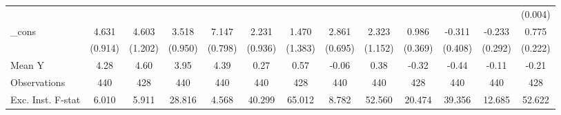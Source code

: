 {\begin{tabular}{l*{12}{c}}
            &                     &                     &                     &                     &                     &                     &                     &                     &                     &                     &                     &     (0.004)         \\
\addlinespace
\_cons      &       4.631\sym{***}&       4.603\sym{***}&       3.518\sym{***}&       7.147\sym{***}&       2.231\sym{**} &       1.470         &       2.861\sym{***}&       2.323\sym{*}  &       0.986\sym{**} &      -0.311         &      -0.233         &       0.775\sym{***}\\
            &     (0.914)         &     (1.202)         &     (0.950)         &     (0.798)         &     (0.936)         &     (1.383)         &     (0.695)         &     (1.152)         &     (0.369)         &     (0.408)         &     (0.292)         &     (0.222)         \\
\midrule
Mean Y      &        4.28         &        4.60         &        3.95         &        4.39         &        0.27         &        0.57         &       -0.06         &        0.38         &       -0.32         &       -0.44         &       -0.11         &       -0.21         \\
Observations&         440         &         428         &         440         &         440         &         440         &         428         &         440         &         440         &         428         &         440         &         440         &         428         \\
Exc. Inst. F-stat&       6.010         &       5.911         &      28.816         &       4.568         &      40.299         &      65.012         &       8.782         &      52.560         &      20.474         &      39.356         &      12.685         &      52.622         \\
\bottomrule
\end{tabular}
}
